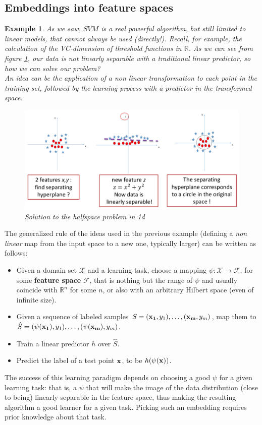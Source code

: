 \documentclass[12pt]{report}
\theoremstyle{plain}
\newtheorem{example}{Example}[chapter]
\newcommand\mcl[1]{\mathcal{#1}}
\begin{document}
\begin{flushleft}
\section{Embeddings into feature spaces}
\begin{example}
	As we saw, $SVM$ is a real powerful algorithm, but still limited to linear models, that cannot always be used (directly!). Recall, for example, the calculation of the VC-dimension of threshold functions in $\mathds{R}$. As we can see from figure \ref{fig:ex_halfspace_kernel}, our data is not linearly separable with a traditional linear predictor, so how we can solve our problem?\\
	An idea can be the application of a non linear transformation to each point in the training set, followed by the learning process with a predictor in the transformed space.
	\begin{figure}[!h]
		\centering
		\includegraphics[scale=0.5]{images/ex_halfspace_kernel.pdf}
		\caption{Solution to the halfspace problem in 1d}
		\label{fig:ex_halfspace_kernel}
	\end{figure}
\end{example}              
The generalized rule of the ideas used in the previous example (defining a \textit{non linear} map from the input space to a new one, typically larger) can be written as follows:
\begin{itemize}
	\item Given a domain set $\mcl{X}$ and a learning task, choose a mapping $\psi:\mcl{X}\to\mcl{F}$, for some \textbf{feature space} $\mcl{F}$, that is nothing but the range of $\psi$ and usually coincide with $\mathds{R}^n$ for some $n$, or also with an arbitrary Hilbert space (even of infinite size).
	\item Given a sequence of labeled samples $S=(\vb{x_1},y_1),\dots,(\vb{x_m},y_m)$, map them to $\hat{S}=(\psi(\vb{x_1}),y_1),\dots,(\psi(\vb{x_m}),y_m)$.
	\item Train a linear predictor $h$ over $\hat{S}$.
	\item Predict the label of a test point $\vb{x}$, to be $h(\psi(\vb{x}))$.
\end{itemize}
The success of this learning paradigm depends on choosing a good $\psi$ for a given learning task: that is, a $\psi$ that will make the image of the data distribution (close to being) linearly separable in the feature space, thus making the resulting algorithm a good learner for a given task. Picking such an embedding requires prior knowledge about that task.


\end{flushleft}
\end{document}
